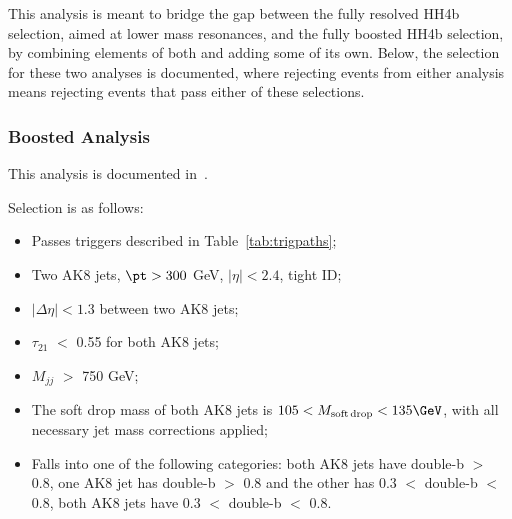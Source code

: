 This analysis is meant to bridge the gap between the fully resolved HH4b selection, aimed at lower mass resonances, and the fully boosted HH4b selection, by combining elements of both and adding some of its own. Below, the selection for these two analyses is documented, where rejecting events from either analysis means rejecting events that pass either of these selections. 

\subsubsection{Boosted Analysis\label{sss:boost}}

This analysis is documented in~\cite{CMS-PAS-B2G-16-026}.

Selection is as follows:
\begin{itemize}
\item Passes triggers described in Table~\ref{tab:trigpaths};
\item Two AK8 jets, $\pt > 300$ GeV, $|\eta| < 2.4$, tight ID;
\item $|\Delta\eta| < 1.3$ between two AK8 jets;
\item $\tau_{21}$ $<$ 0.55 for both AK8 jets;
\item $M_{jj}$ $>$ 750 GeV;
\item The soft drop mass of both AK8 jets is $105 < M_{\rm soft\,drop} < 135\GeV$, with all necessary jet mass corrections applied;
\item Falls into one of the following categories: both AK8 jets have double-b $>$ 0.8, one AK8 jet has double-b $>$ 0.8 and the other has 0.3 $<$ double-b $<$ 0.8, both AK8 jets have 0.3 $<$ double-b $<$ 0.8.
\end{itemize}

